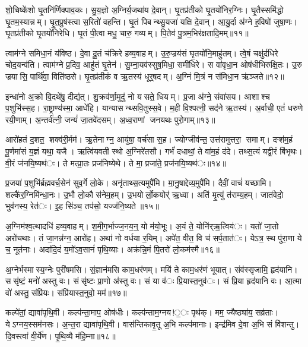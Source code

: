 शो॒चिष्के॑शो घृ॒तनि॑र्णिक्पाव॒कः। सु॒य॒ज्ञो अ॒ग्निर्य॒जथा॑य दे॒वान्। घृ॒तप्र॑तीको घृ॒तयो॑निर॒ग्निः। घृ॒तैस्समि॑द्धो घृ॒तम॒स्यान्नम्। घृ॒त॒प्रुष॑स्त्वा स॒रितो॑ वहन्ति। घृ॒तं पिबन्थ्सु॒यजा॑ यक्षि दे॒वान्। आ॒यु॒र्दा अ॑ग्ने ह॒विषो॑ जुषा॒णः। घृ॒तप्र॑तीको घृ॒तयो॑निरेधि। घृ॒तं पी॒त्वा मधु॒ चारु॒ गव्यम्। पि॒तेव॑ पु॒त्रम॒भिर॑क्षतादि॒मम्॥११॥

त्वाम॑ग्ने समिधा॒नं य॑विष्ठ। दे॒वा दू॒तं च॑क्रिरे हव्य॒वाहम्। उ॒रु॒ज्रय॑सं घृ॒तयो॑नि॒माहु॑तम्। त्वे॒षं चक्षु॑र्दधिरे चोद॒यन्व॑ति। त्वाम॑ग्ने प्र॒दिव॒ आहु॑तं घृ॒तेन॑। सु॒म्ना॒यव॑स्सुष॒मिधा॒ समी॑धिरे। स वा॑वृधा॒न ओष॑धीभिरुक्षि॒तः। उ॒रु ज्रयासि॒ पार्थि॑वा॒ विति॑ष्ठसे। घृ॒तप्र॑तीकं व ऋ॒तस्य॑ धूर्॒षदम्। अ॒ग्निं मि॒त्रं न स॑मिधा॒न ऋ॑ञ्जते॥१२॥

इन्धा॑नो अ॒क्रो वि॒दथे॑षु॒ दीद्य॑त्। शु॒क्रव॑र्णा॒मुदु॑ नो यसते॒ धियम्। प्र॒जा अ॑ग्ने॒ संवा॑सय। आशाश्च प॒शुभि॑स्स॒ह। रा॒ष्ट्राण्य॑स्मा॒ आधे॑हि। यान्यासन्थ्सवि॒तुस्स॒वे। म॒ही वि॒श्पत्नी॒ सद॑ने ऋ॒तस्य॑। अ॒र्वाची॒ एतं॑ धरुणे रयी॒णाम्। अ॒न्तर्व॑त्नी॒ जन्यं॑ जा॒तवे॑दसम्। अ॒ध्व॒राणां जनयथः पुरो॒गाम्॥१३॥

आरो॑हतं द॒शत॒ शक्व॑री॒र्मम॑। ऋ॒तेनाग्न॒ आयु॑षा॒ वर्च॑सा स॒ह। ज्योग्जीव॑न्त॒ उत्त॑रामुत्तरा॒ समाम्। दऱ्श॑म॒हं पू॒र्णमा॑सं य॒ज्ञं यथा॒ यजै। ऋत्वि॑यवती स्थो अ॒ग्निरे॑तसौ। गर्भं॑ दधाथां॒ ते वा॑म॒हं द॑दे। तथ्स॒त्यं यद्वी॒रं बि॑भृथः। वी॒रं ज॑नयि॒ष्यथ॑ः। ते मत्प्रा॒तः प्रज॑निष्येथे। ते मा॒ प्रजा॑ते॒ प्रज॑नयि॒ष्यथ॑ः॥१४॥

प्र॒जया॑ प॒शुभि॑र्ब्रह्मवर्च॒सेन॑ सुव॒र्गे लो॒के। अनृ॑ताथ्स॒त्यमुपै॑मि। मा॒नु॒षाद्देव्य॒मुपै॑मि। दैवीं॒ वाचं॑ यच्छामि। शल्कै॑र॒ग्निमि॑न्धा॒नः। उ॒भौ लो॒कौ स॑नेम॒हम्। उ॒भयोर्लो॒कयोर्॑ ऋ॒ध्वा। अति॑ मृ॒त्युं त॑राम्य॒हम्। जात॑वेदो॒ भुव॑नस्य॒ रेत॑ः। इ॒ह सि॑ञ्च॒ तप॑सो॒ यज्ज॑नि॒ष्यते॥१५॥

अ॒ग्निम॑श्व॒त्थादधि॑ हव्य॒वाहम्। श॒मी॒ग॒र्भाज्ज॒नय॒न्॒ यो म॑यो॒भूः। अ॒यं ते॒ योनि॑र्‌ऋ॒त्विय॑ः। यतो॑ जा॒तो अरो॑चथाः। तं जा॒नन्न॑ग्न॒ आरो॑ह। अथा॑ नो वर्धया र॒यिम्। अपे॑त॒ वीत॒ वि च॑ सर्प॒तात॑ः। येऽत्र॒ स्थ पु॑रा॒णा ये च॒ नूत॑नाः। अदा॑दि॒दं य॒मो॑ऽव॒सानं॑ पृथि॒व्याः। अक्र॑न्नि॒मं पि॒तरो॑ लो॒कम॑स्मै॥१६॥

अ॒ग्नेर्भस्मास्य॒ग्नेः पुरी॑षमसि। सं॒ज्ञान॑मसि काम॒धर॑णम्। मयि॑ ते काम॒धर॑णं भूयात्। संव॑स्सृजामि॒ हृद॑यानि। ससृ॑ष्टं॒ मनो॑ अस्तु वः। संसृ॑ष्टः प्रा॒णो अ॑स्तु वः। सं या व॑ः प्रि॒यास्त॒नुव॑ः। सं प्रि॒या हृद॑यानि वः। आ॒त्मा वो॑ अस्तु॒ संप्रि॑यः। संप्रि॑यास्त॒नुवो॒ मम॑॥१७॥

कल्पे॑तां॒ द्यावा॑पृथि॒वी। कल्प॑न्ता॒माप॒ ओष॑धीः। कल्प॑न्ताम॒ग्नय!॒ः पृथ॑क्। मम॒ ज्यैष्ठ्या॑य॒ सव्र॑ताः। येऽग्नय॒स्सम॑नसः। अ॒न्त॒रा द्यावा॑पृथि॒वी। वास॑न्तिकावृ॒तू अ॒भि कल्प॑मानाः। इन्द्र॑मिव दे॒वा अ॒भि सं वि॑शन्तु। दि॒वस्त्वा॑ वी॒र्ये॑ण। पृ॒थि॒व्यै म॑हि॒म्ना॥१८॥

